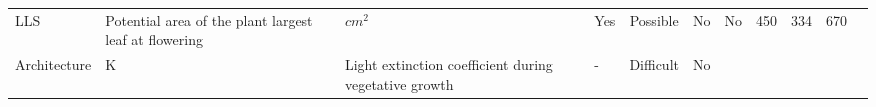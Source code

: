 \documentclass[a4paper]{article}
\begin{document}
\begin{longtable}[]{@{}llllccccrrr@{}}
\begin{minipage}[t]{0.05\columnwidth}
LLS\strut
\end{minipage} & \begin{minipage}[t]{0.19\columnwidth}\raggedright\strut
Potential area of the plant largest leaf at flowering\strut
\end{minipage} & \begin{minipage}[t]{0.06\columnwidth}\raggedright\strut
\(cm^2\)\strut
\end{minipage} & \begin{minipage}[t]{0.06\columnwidth}\centering\strut
Yes\strut
\end{minipage} & \begin{minipage}[t]{0.08\columnwidth}\centering\strut
Possible\strut
\end{minipage} & \begin{minipage}[t]{0.05\columnwidth}\centering\strut
No\strut
\end{minipage} & \begin{minipage}[t]{0.04\columnwidth}\centering\strut
No\strut
\end{minipage} & \begin{minipage}[t]{0.04\columnwidth}\raggedleft\strut
450\strut
\end{minipage} & \begin{minipage}[t]{0.04\columnwidth}\raggedleft\strut
334\strut
\end{minipage} & \begin{minipage}[t]{0.04\columnwidth}\raggedleft\strut
670\strut
\end{minipage}\tabularnewline
\begin{minipage}[t]{0.08\columnwidth}\raggedright\strut
Architecture\strut
\end{minipage} & \begin{minipage}[t]{0.05\columnwidth}\raggedright\strut
K\strut
\end{minipage} & \begin{minipage}[t]{0.19\columnwidth}\raggedright\strut
Light extinction coefficient during vegetative growth\strut
\end{minipage} & \begin{minipage}[t]{0.06\columnwidth}\raggedright\strut
-\strut
\end{minipage} & \begin{minipage}[t]{0.06\columnwidth}\centering\strut
Difficult\strut
\end{minipage} & \begin{minipage}[t]{0.08\columnwidth}\centering\strut
No\strut
\end{minipage} & \begin{minipage}[t]{0.05\columnwidth}\centering\strut

\end{minipage}
\end{longtable}
\end{document}
